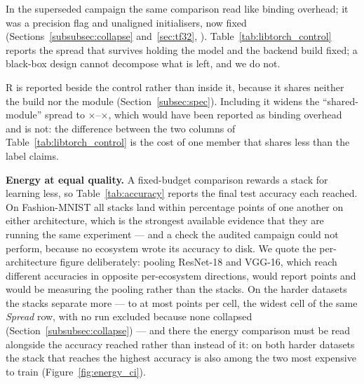 In the superseded campaign the same comparison read like binding overhead; it
was a precision flag and unaligned initialisers, now fixed
(Sections~\ref{subsubsec:collapse} and~\ref{sec:tf32}, ). Table~\ref{tab:libtorch_control}
reports the spread that survives holding the model and the backend build fixed;
a black-box design cannot decompose what is left, and we do not.

R is reported beside the control rather than inside it, because it shares
neither the build nor the module (Section~\ref{subsec:spec}). Including it widens the ``shared-module'' spread to
\vFamilySpreadMin$\times$--\vFamilySpreadMax$\times$, which would have been
reported as binding overhead and is not: the difference between the two columns
of Table~\ref{tab:libtorch_control} is the cost of one member that shares less
than the label claims.

\begin{table}[t]
\centering
\caption{Spread within the shared-module control group (one LibTorch build,
module and data pipeline) against the full spread, per cell. The
LibTorch-family column adds R.}
\label{tab:libtorch_control}
{\footnotesize\setlength{\tabcolsep}{1.5pt}}
\end{table}

\textbf{Energy at equal quality.} A fixed-budget comparison rewards a stack for
learning less, so Table~\ref{tab:accuracy} reports the final test accuracy each
reached. On Fashion-MNIST all \vEcosystems{} stacks land within
\vAccBlockSpreadFashionMax{} percentage points of one another on either
architecture, which is the strongest available evidence that they are running
the same experiment --- and a check the audited campaign could not perform,
because no ecosystem wrote its accuracy to disk. We quote the per-architecture
figure deliberately: pooling ResNet-18 and VGG-16, which reach different
accuracies in opposite per-ecosystem directions, would report
\vAccSpreadFashion{} points and would be measuring the pooling rather than the
stacks. On the harder datasets the stacks separate more --- to at most
\vAccBlockSpreadTrainedMax{} points per cell, the widest cell of the same
\emph{Spread} row, with no run excluded because none collapsed
(Section~\ref{subsubsec:collapse}) --- and there the energy
comparison must be read alongside the accuracy reached rather than instead of
it: on both harder datasets the stack that reaches the highest accuracy is also
among the two most expensive to train (Figure~\ref{fig:energy_ci}).

